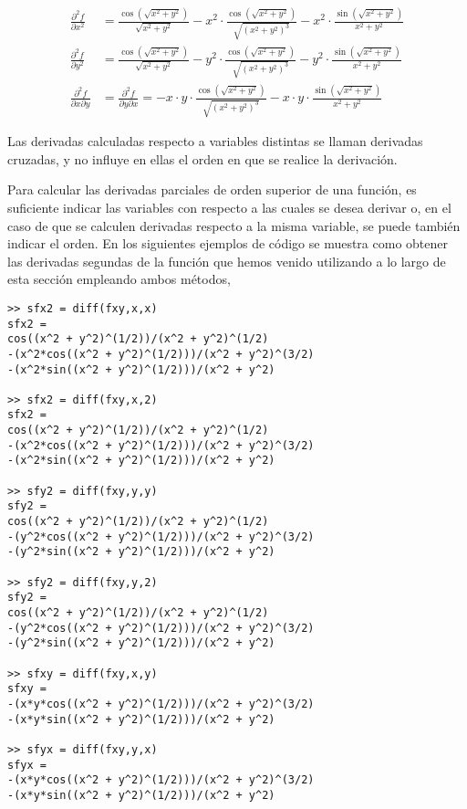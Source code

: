 \begin{align*}
\frac{\partial^2f}{\partial x^2} &= \frac{\cos(\sqrt{x^2+y^2})}{\sqrt{x^2+y^2}} - 
x^2 \cdot \frac{\cos(\sqrt{x^2+y^2})}{\sqrt{(x^2+y^2)^3}} -
x^2 \cdot \frac{\sin(\sqrt{x^2+y^2})}{x^2+y^2} \\
\frac{\partial^2f}{\partial y^2} &= \frac{\cos(\sqrt{x^2+y^2})}{\sqrt{x^2+y^2}} - 
y^2 \cdot \frac{\cos(\sqrt{x^2+y^2})}{\sqrt{(x^2+y^2)^3}} -
y^2 \cdot \frac{\sin(\sqrt{x^2+y^2})}{x^2+y^2} \\
\frac{\partial^2f}{\partial x\partial y} &= \frac{\partial^2f}{\partial y\partial x} =-x\cdot y\cdot\frac{\cos(\sqrt{x^2+y^2})}{\sqrt{(x^2+y^2)^3}} - 
x\cdot y \cdot\frac{\sin(\sqrt{x^2+y^2})}{x^2+y^2} 
\end{align*}

Las derivadas calculadas respecto a variables distintas se llaman derivadas cruzadas, y no influye en ellas el orden en que se realice la derivación.

Para calcular las derivadas parciales de orden superior de una función, es suficiente indicar las variables con respecto a las cuales se desea derivar o, en el caso de que se calculen derivadas respecto a la misma variable, se puede también indicar el orden. En los siguientes ejemplos de código se muestra como obtener las derivadas segundas de la función que hemos venido utilizando a lo largo de esta sección empleando ambos métodos,
\begin{verbatim}
>> sfx2 = diff(fxy,x,x) 
sfx2 = 
cos((x^2 + y^2)^(1/2))/(x^2 + y^2)^(1/2)
-(x^2*cos((x^2 + y^2)^(1/2)))/(x^2 + y^2)^(3/2)
-(x^2*sin((x^2 + y^2)^(1/2)))/(x^2 + y^2)
 
>> sfx2 = diff(fxy,x,2) 
sfx2 = 
cos((x^2 + y^2)^(1/2))/(x^2 + y^2)^(1/2)
-(x^2*cos((x^2 + y^2)^(1/2)))/(x^2 + y^2)^(3/2)
-(x^2*sin((x^2 + y^2)^(1/2)))/(x^2 + y^2)
 
>> sfy2 = diff(fxy,y,y) 
sfy2 = 
cos((x^2 + y^2)^(1/2))/(x^2 + y^2)^(1/2)
-(y^2*cos((x^2 + y^2)^(1/2)))/(x^2 + y^2)^(3/2)
-(y^2*sin((x^2 + y^2)^(1/2)))/(x^2 + y^2)
 
>> sfy2 = diff(fxy,y,2) 
sfy2 = 
cos((x^2 + y^2)^(1/2))/(x^2 + y^2)^(1/2)
-(y^2*cos((x^2 + y^2)^(1/2)))/(x^2 + y^2)^(3/2) 
-(y^2*sin((x^2 + y^2)^(1/2)))/(x^2 + y^2)
 
>> sfxy = diff(fxy,x,y) 
sfxy = 
-(x*y*cos((x^2 + y^2)^(1/2)))/(x^2 + y^2)^(3/2)
-(x*y*sin((x^2 + y^2)^(1/2)))/(x^2 + y^2)
 
>> sfyx = diff(fxy,y,x) 
sfyx = 
-(x*y*cos((x^2 + y^2)^(1/2)))/(x^2 + y^2)^(3/2)
-(x*y*sin((x^2 + y^2)^(1/2)))/(x^2 + y^2) 
\end{verbatim}

